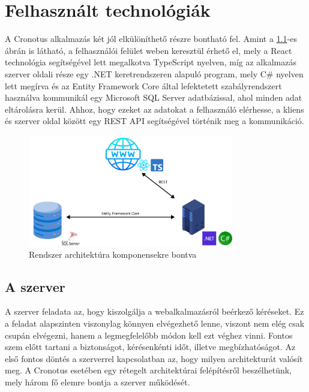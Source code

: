\chapter{Felhasznált technológiák}


A Cronotus alkalmazás két jól elkülöníthető részre bontható fel. Amint a \ref{fig:architecture_overview}-es ábrán is látható, a felhasználói felület weben keresztül érhető el, mely a React\cite{reactdocs} technológia segítségével lett megalkotva TypeScript\cite{typescriptdocs} nyelven, míg az alkalmazás szerver oldali része egy .NET keretrendszeren\cite{dotnetnocs} alapuló program, mely C\# nyelven\cite{csharpdocs} lett megírva és az Entity Framework Core\cite{entityframeworkdocs} által lefektetett szabályrendszert használva kommunikál egy Microsoft SQL Server\cite{sqlserverdocs} adatbázissal, ahol minden adat eltárolásra kerül.
Ahhoz, hogy ezeket az adatokat a felhasználó elérhesse, a kliens és szerver oldal között egy REST API\cite{restfuldocs} segítségével történik meg a kommunikáció.

\begin{figure}[h]
    \centering
    \includegraphics[width=0.8\textwidth]{./images/cronotus_architecture_overview.png}
    \caption{Rendszer architektúra komponensekre bontva}
    \label{fig:architecture_overview}
\end{figure}


\section{A szerver}

A szerver feladata az, hogy kiszolgálja a webalkalmazásról beérkező kéréseket. Ez a feladat alapszinten viszonylag könnyen elvégezhető lenne, viszont nem elég csak csupán elvégezni, hanem a legmegfelelőbb módon kell ezt véghez vinni. Fontos szem előtt tartani a biztonságot, kérésenkénti időt, illetve megbízhatóságot. Az első fontos döntés a szerverrel kapcsolatban az, hogy milyen architekturát valósít meg. A Cronotus esetében egy rétegelt architektúrai felépítésről\cite{onionarchitecturedocs} beszélhetünk, mely három fő elemre bontja a szerver működését.

